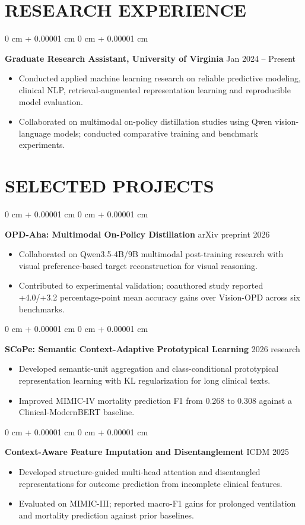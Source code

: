 \documentclass[10pt, letterpaper]{article}
\newenvironment{highlights}{
    \begin{itemize}[
        topsep=0.02 cm,
        parsep=0 cm,
        partopsep=0pt,
        itemsep=0pt,
        leftmargin=0 cm + 10pt
    ]
}{
    \end{itemize}
} %
\newenvironment{onecolentry}{
    \begin{adjustwidth}{
        0 cm + 0.00001 cm
    }{
        0 cm + 0.00001 cm
    }
}{
    \end{adjustwidth}
} %
\begin{document}
\section{RESEARCH EXPERIENCE}
\begin{onecolentry}
\textbf{Graduate Research Assistant, University of Virginia} \hfill Jan 2024 -- Present
\begin{highlights}
\item Conducted applied machine learning research on reliable predictive modeling, clinical NLP, retrieval-augmented representation learning and reproducible model evaluation.
\item Collaborated on multimodal on-policy distillation studies using Qwen vision-language models; conducted comparative training and benchmark experiments.
\end{highlights}
\end{onecolentry}
\section{SELECTED PROJECTS}
\begin{onecolentry}
\textbf{OPD-Aha: Multimodal On-Policy Distillation} \hfill arXiv preprint 2026
\begin{highlights}
\item Collaborated on Qwen3.5-4B/9B multimodal post-training research with visual preference-based target reconstruction for visual reasoning.
\item Contributed to experimental validation; coauthored study reported +4.0/+3.2 percentage-point mean accuracy gains over Vision-OPD across six benchmarks.
\end{highlights}
\end{onecolentry}
\vspace{0.04 cm}
\begin{onecolentry}
\textbf{SCoPe: Semantic Context-Adaptive Prototypical Learning} \hfill 2026 research
\begin{highlights}
\item Developed semantic-unit aggregation and class-conditional prototypical representation learning with KL regularization for long clinical texts.
\item Improved MIMIC-IV mortality prediction F1 from 0.268 to 0.308 against a Clinical-ModernBERT baseline.
\end{highlights}
\end{onecolentry}
\vspace{0.04 cm}
\begin{onecolentry}
\textbf{Context-Aware Feature Imputation and Disentanglement} \hfill ICDM 2025
\begin{highlights}
\item Developed structure-guided multi-head attention and disentangled representations for outcome prediction from incomplete clinical features.
\item Evaluated on MIMIC-III; reported macro-F1 gains for prolonged ventilation and mortality prediction against prior baselines.
\end{highlights}
\end{onecolentry}
\vspace{0.04 cm}
\end{document}

